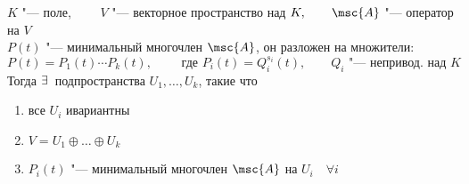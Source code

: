 \begin{theorem}
	$ K $ "--- поле, $ \qquad V $ "--- векторное пространство над $ K, \qquad \msc{A} $ "--- оператор на $ V $ \\
	$ P(t) $ "--- минимальный многочлен $ \msc{A} $, он разложен на множители:
	$$ P(t) = P_1(t) \cdots P_k(t), \qquad \text{ где } P_i(t) = Q_i^{s_i}(t), \qquad Q_i \text{ "--- непривод. над } K $$
	Тогда $ \exists\, $ подпространства $ U_1, \dots, U_k $, такие что
	\begin{enumerate}
		\item все $ U_i $ ивариантны
		\item $ V = U_1 \oplus \dots \oplus U_k $
		\item $ P_i(t) $ "--- минимальный многочлен $ \msc{A} $ на $ U_i \quad \forall i $
	\end{enumerate}
\end{theorem}

